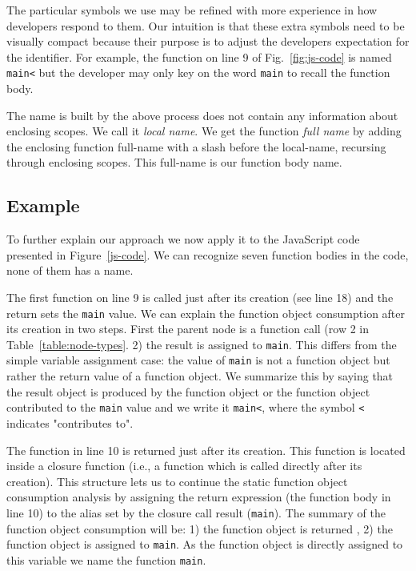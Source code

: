 \documentclass[10pt, preprint]{sigplanconf}
\begin{document}
The particular symbols we use may be refined with more experience in how developers respond to them. Our intuition is that these extra symbols need to be visually compact because their purpose is to adjust the developers expectation for the identifier. For example, the function on line 9 of Fig.~\ref{fig:js-code} is named \texttt{main<} but the developer may only key on the word \texttt{main} to recall the function body. 

The name is built by the above process does not contain any information about enclosing scopes. We call it \textit{local name}. We get the function \textit{full name} by adding the enclosing function full-name with a slash before the local-name, recursing through enclosing scopes. This full-name is our function body name.




\subsection{Example}
  
To further explain our approach we now apply it to the JavaScript code presented in Figure~\ref{js-code}. We can recognize seven function bodies in the code, none of them has a name. 

The first function on line 9 is called just after its creation (see line 18) and the return sets the {\small\texttt{main}} value. We can explain the function object consumption after its creation in two steps. First the parent node is a function call (row 2 in Table~\ref{table:node-types}. 2) the result is assigned to {\small\texttt{main}}. This differs from the simple variable assignment case: the value of {\small\texttt{main}} is not a function object but rather the return value of a function object.   We summarize this by saying that the result object is produced by the function object or the function object contributed to the {\small\texttt{main}} value and we write it {\small\texttt{main<}}, where the symbol {\small\texttt{<}} indicates "contributes to".

The function in line 10 is returned just after its creation. This function is located inside a closure function (i.e., a function which is called directly after its creation). This structure lets us to continue the static function object consumption analysis by assigning the return expression (the function body in line 10) to the alias set by the closure call result ({\small\texttt{main}}). The summary of the function object consumption will be: 1) the function object is returned , 2) the function object is assigned to {\small\texttt{main}}. As the function object is directly assigned to this variable we name the function {\small\texttt{main}}.
\end{document}
